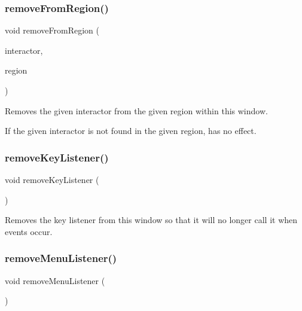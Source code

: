 \subsubsection{\texorpdfstring{remove\+From\+Region()}{removeFromRegion()}\hspace{0.1cm}{\footnotesize\ttfamily [4/4]}}
{\footnotesize\ttfamily void remove\+From\+Region (\begin{DoxyParamCaption}\item[{\mbox{\hyperlink{classGInteractor}{G\+Interactor}} \&}]{interactor,  }\item[{const std\+::string \&}]{region }\end{DoxyParamCaption})\hspace{0.3cm}{\ttfamily [virtual]}}



Removes the given interactor from the given region within this window. 

If the given interactor is not found in the given region, has no effect. \mbox{\label{classGWindow_a43095f41cab3be732b49f29970484b05}} 
\subsubsection{\texorpdfstring{remove\+Key\+Listener()}{removeKeyListener()}}
{\footnotesize\ttfamily void remove\+Key\+Listener (\begin{DoxyParamCaption}{ }\end{DoxyParamCaption})\hspace{0.3cm}{\ttfamily [virtual]}}



Removes the key listener from this window so that it will no longer call it when events occur. 

\mbox{\label{classGWindow_a718d186fa807d6dec721c3b6f0c4309a}} 
\subsubsection{\texorpdfstring{remove\+Menu\+Listener()}{removeMenuListener()}}
{\footnotesize\ttfamily void remove\+Menu\+Listener (\begin{DoxyParamCaption}{ }\end{DoxyParamCaption})\hspace{0.3cm}{\ttfamily [virtual]}}



